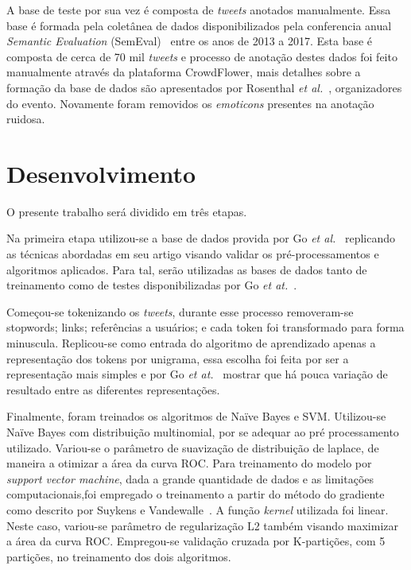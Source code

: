 A base de teste por sua vez é composta de \textit{tweets} anotados manualmente.
Essa base é formada pela coletânea de dados disponibilizados pela conferencia anual \textit{Semantic Evaluation}
(SemEval)~\cite{semeval17} entre os anos de 2013 a 2017.
Esta base é composta de cerca de 70 mil \textit{tweets} e processo de anotação destes dados foi feito manualmente
através da plataforma CrowdFlower, mais detalhes sobre a formação da base de dados são apresentados por Rosenthal
\textit{et al.}~\cite{rosenthal17}, organizadores do evento.
Novamente foram removidos os \textit{emoticons} presentes na anotação ruidosa.

\section{Desenvolvimento}

O presente trabalho será dividido em três etapas.

Na primeira etapa utilizou-se a base de dados provida por Go \textit{et al.}~\cite{go09} replicando as técnicas
abordadas em seu artigo visando validar os pré-processamentos e algoritmos aplicados.
Para tal, serão utilizadas as bases de dados tanto de treinamento como de testes disponibilizadas por Go
\textit{et at.}~\cite{go09}.

Começou-se tokenizando os \textit{tweets}, durante esse processo removeram-se stopwords; links; referências a usuários;
e cada token foi transformado para forma minuscula.
Replicou-se como entrada do algoritmo de aprendizado apenas a representação dos tokens por unigrama, essa escolha foi
feita por ser a representação mais simples e por Go \textit{et at.}~\cite{go09} mostrar que há pouca variação de
resultado entre as diferentes representações.

Finalmente, foram treinados os algoritmos de Naïve Bayes e SVM.
Utilizou-se Naïve Bayes com distribuição multinomial, por se adequar ao pré processamento utilizado.
Variou-se o parâmetro de suavização de distribuição de laplace, de maneira a otimizar a área da curva ROC.
Para treinamento do modelo por \textit{support vector machine}, dada a grande quantidade de dados e as limitações
computacionais,foi empregado o treinamento a partir do método do gradiente como descrito por Suykens e
Vandewalle~\cite{suykens99}.
A função \textit{kernel} utilizada foi linear.
Neste caso, variou-se parâmetro de regularização L2 também visando maximizar a área da curva ROC.
Empregou-se validação cruzada por K-partições, com 5 partições, no treinamento dos dois algoritmos.

